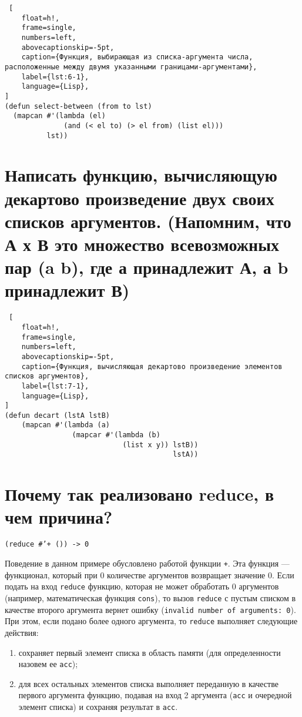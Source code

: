 \begin{lstlisting} [
	float=h!,
	frame=single,
	numbers=left,
	abovecaptionskip=-5pt,
	caption={Функция, выбирающая из списка-аргумента числа, расположенные между двумя указанными границами-аргументами},
	label={lst:6-1},
	language={Lisp},
]
(defun select-between (from to lst)
  (mapcan #'(lambda (el)
              (and (< el to) (> el from) (list el)))
          lst))
\end{lstlisting}

\section{Написать функцию, вычисляющую декартово произведение двух своих списков аргументов. (Напомним, что А х В это множество всевозможных пар (a b), где а принадлежит А, а b принадлежит В)}

\begin{lstlisting} [
	float=h!,
	frame=single,
	numbers=left,
	abovecaptionskip=-5pt,
	caption={Функция, вычисляющая декартово произведение элементов списков аргументов},
	label={lst:7-1},
	language={Lisp},
]
(defun decart (lstA lstB)
    (mapcan #'(lambda (a)
                (mapcar #'(lambda (b)
                            (list x y)) lstB))
                                        lstA))
\end{lstlisting}

\section{Почему так реализовано reduce, в чем причина?}

\texttt{(reduce \#'+ ()) -> 0}

Поведение в данном примере обусловлено работой функции \texttt{+}. Эта функция --- функционал, который при 0 количестве аргументов возвращает значение 0. Если подать на вход \texttt{reduce} функцию, которая не может обработать 0 аргументов (например, математическая функция \texttt{cons}), то вызов \texttt{reduce} с пустым списком в качестве второго аргумента вернет ошибку (\texttt{invalid number of arguments: 0}). При этом, если подано более одного аргумента, то \texttt{reduce} выполняет следующие действия:
\begin{enumerate}
    \item сохраняет первый элемент списка в область памяти (для определенности назовем ее \texttt{acc});
    \item для всех остальных элементов списка выполняет переданную в качестве первого аргумента функцию, подавая на вход 2 аргумента (\texttt{acc} и очередной элемент списка) и сохраняя результат в \texttt{acc}.
\end{enumerate}

